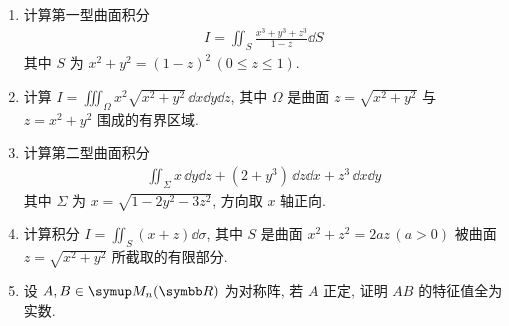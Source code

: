 \documentclass{ctexart}
\let\le\leqslant
\begin{document}
\begin{enumerate}[resume=exer]
        \item 计算第一型曲面积分
        \begin{align*}
            I = \iint_{S} \frac{x^{3} + y^{3} + z^{3}}{1-z} \dd{S}
        \end{align*}
        其中 $ S $ 为 $ x^{2} + y^{2} = (1-z)^{2}\,(0 \le z \le 1) $. 
        \item 计算 $ I = \iiint_{\Omega} x^{2}\sqrt{x^{2} + y^{2}}\,\dd x\dd y\dd z $, 其中 $ \Omega $ 是曲面 $ z = \sqrt{x^{2} + y^{2}} $ 与 $ z = x^{2} + y^{2} $ 围成的有界区域.
        \item 计算第二型曲面积分
        \begin{align*}
            \iint_{\Sigma} x\,\dd y\dd z + (2 + y^{3})\,\dd z\dd x + z^{3}\,\dd x\dd y
        \end{align*}
        其中 $ \Sigma $ 为 $ x = \sqrt{1 - 2y^{2} - 3z^{2}} $, 方向取 $ x $ 轴正向.
        \item 计算积分 $ I = \iint_{S} (x + z) \dd{\sigma} $, 其中 $ S $ 是曲面 $ x^{2} + z^{2} = 2az\,(a > 0) $ 被曲面 $ z = \sqrt{x^{2} + y^{2}} $ 所截取的有限部分.
        \item 设 $ A, B \in \MM $ 为对称阵, 若 $ A $ 正定, 证明 $ AB $ 的特征值全为实数.
    \end{enumerate}
\end{document}

